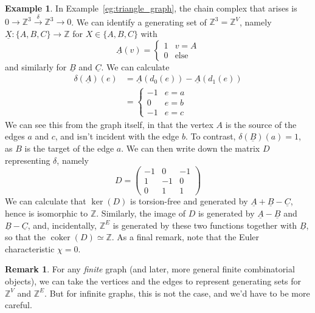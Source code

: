 \documentclass{tufte-handout}
\def\ZZ{\mathbb{Z}}
\DeclareMathOperator{\coker}{coker}
\theoremstyle{definition}
\newtheorem{example}{Example}
\newtheorem*{rem}{Remark}
\begin{document}
\begin{example}
In Example~\ref{eg:triangle_graph}, the chain complex that arises is $0\to\ZZ^3\xrightarrow{\delta} \ZZ^3 \to 0$. We can identify a generating set of $\ZZ^3 = \ZZ^V$, namely $\underline{X}\colon\{A,B,C\}\to \ZZ$ for $X\in \{A,B,C\}$ with\[
	\underline{A}(v) = \begin{cases}
				1 & v=A\\
				0 & \text{else}
	\end{cases}
\]
and similarly for $\underline{B}$ and $\underline{C}$. We can calculate
\begin{align*}
	\delta(\underline{A})(e) & = \underline{A}(d_0(e)) - \underline{A}(d_1(e))\\
							& =\begin{cases}
							-1 & e=a\\
							0 & e=b\\
							-1& e=c
							\end{cases}
\end{align*}
We can see this from the graph itself, in that the vertex $A$ is the source of the edges $a$ and $c$, and isn't incident with the edge $b$. To contrast, $\delta(\underline{B})(a) = 1$, as $B$ is the target of the edge $a$. We can then write down the matrix $D$ representing $\delta$, namely
\[
	D = \begin{pmatrix}
		-1 & 0 & -1\\
		1 & -1 & 0\\
		0 & 1 & 1
	\end{pmatrix}
\]
We can calculate that $\ker(D)$ is torsion-free and generated by $\underline{A} + \underline{B} - \underline{C}$, hence is isomorphic to $\mathbb{Z}$. Similarly, the image of $D$ is generated by $\underline{A} - \underline{B}$ and $\underline{B} - \underline{C}$, and, incidentally, $\ZZ^E$ is generated by these two functions together with $\underline{B}$, so that the $\coker(D) \simeq \ZZ$. As a final remark, note that the Euler characteristic $\chi=0$.
\end{example}

\begin{rem}\label{remark:finite_complexes_basis}
For any \emph{finite} graph (and later, more general finite combinatorial objects), we can take the vertices and the edges to represent generating sets for $\ZZ^V$ and $\ZZ^E$. But for infinite graphs, this is not the case, and we'd have to be more careful.
\end{rem}
\end{document}
